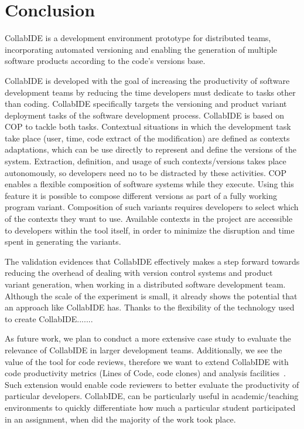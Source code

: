 
\section{Conclusion}
\label{sec:conclusion}

CollabIDE is a development environment prototype for distributed teams, incorporating automated versioning and enabling the generation of multiple software products according to the code's versions base.

CollabIDE is developed with the goal of increasing the productivity of software development teams by reducing the time developers must dedicate to tasks other than coding. CollabIDE specifically targets the versioning and product variant deployment tasks of the software development process. CollabIDE is based on \ac{COP} to tackle both tasks. Contextual situations in which the development task take place (\eg user, time, code extract of the modification) are defined as contexts adaptations, which can be use directly to represent and define the versions of the system. Extraction, definition, and usage of such contexts/versions takes place autonomously, so developers need no to be distracted by these activities. 
\ac{COP} enables a flexible composition of software systems while they execute. Using this feature it is possible to compose different versions as part of a fully working program variant. Composition of such variants requires developers to select which of the contexts they want to use. Available contexts in the project are accessible to developers within the tool itself, in order to minimize the disruption and time spent in generating the variants.

The validation evidences that CollabIDE effectively makes a step forward towards reducing the overhead of dealing with version control systems and product variant generation, when working in a distributed software development team.
Although the scale of the experiment is small, it already shows the potential that an approach like 
CollabIDE has. Thanks to the flexibility of the technology used to create CollabIDE.......


As future work, we plan to conduct a more extensive case study to evaluate the relevance of CollabIDE in larger development teams. Additionally, we see the value of the tool for code reviews, therefore we want to extend CollabIDE with code productivity metrics (\eg Lines of Code, code clones) and analysis facilities~\cite{lienhard12}. Such extension would enable code reviewers to better evaluate the productivity of particular developers. CollabIDE, can be particularly useful in academic/teaching environments to quickly differentiate how much a particular student participated in an assignment, when did the majority of the work took place.

\endinput
